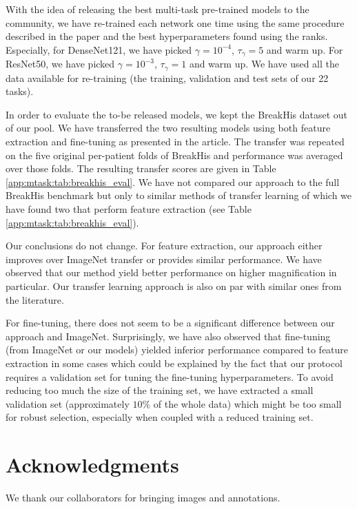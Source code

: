 With the idea of releasing the best multi-task pre-trained models to the community, we have re-trained each network one time using the same procedure  described in the paper and the best hyperparameters found using the ranks. Especially, for DenseNet121, we have picked $\gamma = 10^{-4}$, $\tau_\gamma = 5$ and warm up. For ResNet50, we have picked $\gamma = 10^{-3}$, $\tau_\gamma = 1$ and warm up. We have used all the data available for re-training (\ie the training, validation and test sets of our 22 tasks).

In order to evaluate the to-be released models, we kept the BreakHis dataset \cite{spanhol2015dataset} out of our pool. We have transferred the two resulting models using both feature extraction and fine-tuning as presented in the article. The transfer was repeated on the five original per-patient folds of BreakHis and performance was averaged over those folds. The resulting transfer scores are given in Table \ref{app:mtask:tab:breakhis_eval}. We have not compared our approach to the full BreakHis benchmark but only to similar methods of transfer learning of which we have found two \cite{spanhol2017deep, song2017supervised} that perform feature extraction (see Table \ref{app:mtask:tab:breakhis_eval}).

Our conclusions do not change. For feature extraction, our approach either improves over ImageNet transfer or provides similar performance. We have observed that our method yield better performance on higher magnification in particular. Our transfer learning approach is also on par with similar ones from the literature.

For fine-tuning, there does not seem to be a significant difference between our approach and ImageNet. Surprisingly, we have also observed that fine-tuning (from ImageNet or our models) yielded inferior performance compared to feature extraction in some cases which could be explained by the fact that our protocol requires a validation set for tuning the fine-tuning hyperparameters. To avoid reducing too much the size of the training set, we have extracted a small validation set (approximately $10\%$ of the whole data) which might be too small for robust selection, especially when coupled with a reduced training set.

\section{Acknowledgments}

We thank our collaborators for bringing images and annotations. 

